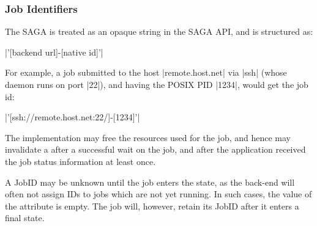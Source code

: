   
  \subsubsection{Job Identifiers}
  
    The SAGA  is treated as an opaque string in the
    SAGA API, and is structured as: 

      \shift |'[backend url]-[native id]'|

    For example, a job submitted to the host |remote.host.net|
    via |ssh| (whose daemon runs on port |22|), and having the
    POSIX PID |1234|, would get the job id:

      \shift |'[ssh://remote.host.net:22/]-[1234]'|

    The implementation may free the resources used for the job,
    and hence may invalidate a  after a successful
    wait on the job, and after the application received the job
    status information at least once.

    A JobID may be unknown until the job enters the 
    state, as the back-end will often not assign IDs to jobs
    which are not yet running.  In such cases, the value of the
     attribute is empty.  The job will, however,
    retain its JobID after it enters a final state.
      


